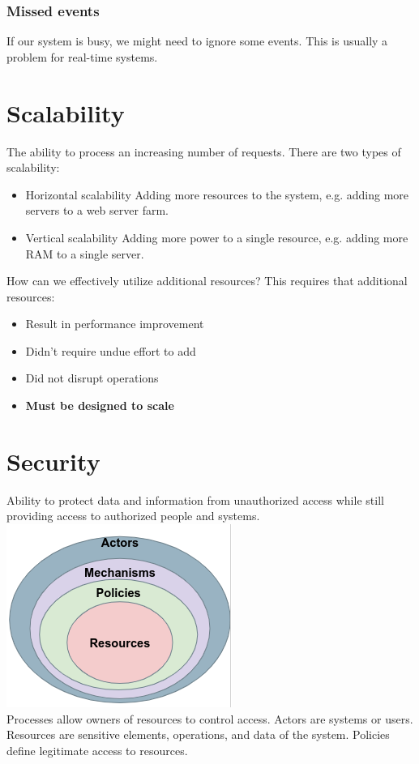 \subsubsection{Missed events}
If our system is busy, we might need to ignore some events. This is usually a problem for real-time systems.

\section{Scalability}
The ability to process an increasing number of requests. There are two types of scalability:
\begin{itemize}
	\item Horizontal scalability
	      \subitem Adding more resources to the system, e.g. adding more servers to a web server farm.
	\item Vertical scalability
	      \subitem Adding more power to a single resource, e.g. adding more RAM to a single server.
\end{itemize}
How can we effectively utilize additional resources? This requires that additional resources:
\begin{itemize}
	\item Result in performance improvement
	\item Didn't require undue effort to add
	\item Did not disrupt operations
	\item \textbf{Must be designed to scale}
\end{itemize}

\section{Security}
Ability to protect data and information from unauthorized access while still providing access to authorized people and systems.\\
\includegraphics{lessons/images/security.png}\\
Processes allow owners of resources to control access. Actors are systems or users. Resources are sensitive elements, operations, and data of the system. Policies define legitimate access to resources.
